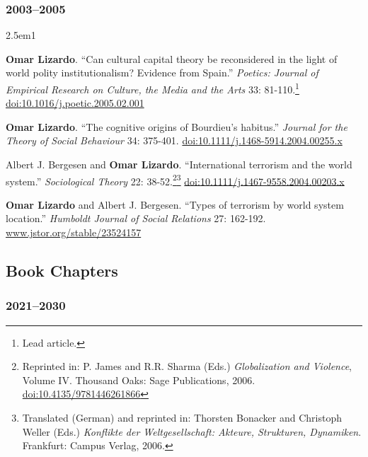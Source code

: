 \documentclass[
]{article}
\newenvironment{cventry}{\begin{hangparas}{2.5em}{1}}{\end{hangparas}}
\begin{document}
\subsubsection{2003--2005}\label{section-14}

\begin{cventry}

\textbf{Omar Lizardo}. ``Can cultural capital theory be reconsidered in
the light of world polity institutionalism? Evidence from Spain.''
\emph{Poetics: Journal of Empirical Research on Culture, the Media and
the Arts} 33: 81-110.\footnote{Lead article.}
\href{https://doi.org/10.1016/j.poetic.2005.02.001}{doi:10.1016/j.poetic.2005.02.001}

\textbf{Omar Lizardo}. ``The cognitive origins of Bourdieu's habitus.''
\emph{Journal for the Theory of Social Behaviour} 34: 375-401.
\href{https://doi.org/10.1111/j.1468-5914.2004.00255.x}{doi:10.1111/j.1468-5914.2004.00255.x}

Albert J. Bergesen and \textbf{Omar Lizardo}. ``International terrorism
and the world system.'' \emph{Sociological Theory} 22:
38-52.\footnote{Reprinted in: P. James and R.R. Sharma (Eds.)
  \emph{Globalization and Violence}, Volume IV. Thousand Oaks: Sage
  Publications, 2006.
  \href{https://doi.org/10.4135/9781446261866}{doi:10.4135/9781446261866}}\footnote{Translated
  (German) and reprinted in: Thorsten Bonacker and Christoph Weller
  (Eds.) \emph{Konflikte der Weltgesellschaft: Akteure, Strukturen,
  Dynamiken}. Frankfurt: Campus Verlag, 2006.}
\href{https://doi.org/10.1111/j.1467-9558.2004.00203.x}{doi:10.1111/j.1467-9558.2004.00203.x}

\textbf{Omar Lizardo} and Albert J. Bergesen. ``Types of terrorism by
world system location.'' \emph{Humboldt Journal of Social Relations} 27:
162-192.
\href{https://www.jstor.org/stable/23524157}{www.jstor.org/stable/23524157}

\end{cventry}

\subsection{Book Chapters}\label{book-chapters}

\subsubsection{2021--2030}\label{section-15}
\end{document}
